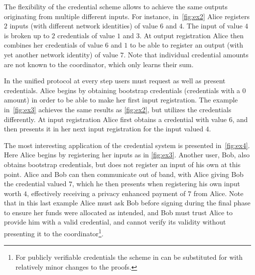 \documentclass[a4paper]{article}
\begin{document}
The flexibility of the credential scheme allows to achieve the same outputs originating from multiple different inputs. For instance, in~\cref{fig:ex2} Alice registers $2$ inputs (with different network identities) of value $6$ and $4$. The input of value $4$ is broken up to  $2$ credentials of value $1$ and $3$. At output registration Alice then combines her credentials of value $6$ and $1$ to be able to register an output (with yet another network identity) of value $7$. Note that individual credential amounts are not known to the coordinator, which only learns their sum.

In the unified protocol at every step users must request as well as present credentials. Alice begins by obtaining bootstrap credentials (credentials with a 0 amount) in order to be able to make her first input registration. The example in~\cref{fig:ex3} achieves the same results as \cref{fig:ex2}, but utilizes the credentials differently. At input registration Alice first obtains a credential with value $6$, and then presents it in her next input registration for the input valued $4$.

The most interesting application of the credential system is presented in~\cref{fig:ex4}. Here Alice begins by registering her inputs as in \cref{fig:ex3}. Another user, Bob, also obtains bootstrap credentials, but does not register an input of his own at this point. Alice and Bob can then communicate out of band, with Alice giving Bob the credential valued $7$, which he then presents when registering his own input worth $4$, effectively receiving a privacy enhanced payment of $7$ from Alice. Note that in this last example Alice must ask Bob before signing during the final phase to ensure her funds were allocated as intended, and Bob must trust Alice to provide him with a valid credential, and cannot verify its validity without presenting it to the coordinator\footnote{For publicly verifiable credentials the scheme in \cite{baldimtsi2013anonymous} can be substituted for \cite{chase2019signal} with relatively minor changes to the proofs.}.
\end{document}

